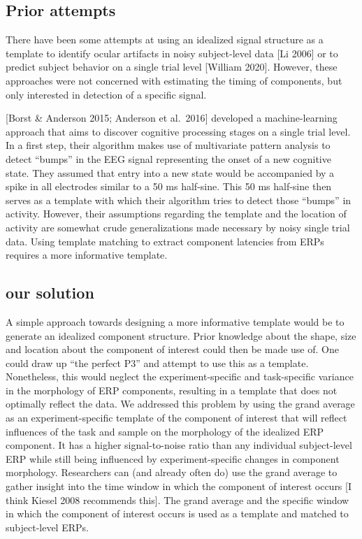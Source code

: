 \documentclass[
  man,floatsintext]{apa7}
\begin{document}
\hypertarget{prior-attempts}{%
\subsection{Prior attempts}\label{prior-attempts}}

There have been some attempts at using an idealized signal structure as a template to identify ocular artifacts in noisy subject-level data {[}Li 2006{]} or to predict subject behavior on a single trial level {[}William 2020{]}. However, these approaches were not concerned with estimating the timing of components, but only interested in detection of a specific signal.

{[}Borst \& Anderson 2015; Anderson et al.~2016{]} developed a machine-learning approach that aims to discover cognitive processing stages on a single trial level. In a first step, their algorithm makes use of multivariate pattern analysis to detect ``bumps'' in the EEG signal representing the onset of a new cognitive state. They assumed that entry into a new state would be accompanied by a spike in all electrodes similar to a 50 ms half-sine. This 50 ms half-sine then serves as a template with which their algorithm tries to detect those ``bumps'' in activity. However, their assumptions regarding the template and the location of activity are somewhat crude generalizations made necessary by noisy single trial data. Using template matching to extract component latencies from ERPs requires a more informative template.

\hypertarget{our-solution}{%
\subsection{our solution}\label{our-solution}}

A simple approach towards designing a more informative template would be to generate an idealized component structure. Prior knowledge about the shape, size and location about the component of interest could then be made use of. One could draw up ``the perfect P3'' and attempt to use this as a template. Nonetheless, this would neglect the experiment-specific and task-specific variance in the morphology of ERP components, resulting in a template that does not optimally reflect the data. We addressed this problem by using the grand average as an experiment-specific template of the component of interest that will reflect influences of the task and sample on the morphology of the idealized ERP component. It has a higher signal-to-noise ratio than any individual subject-level ERP while still being influenced by experiment-specific changes in component morphology. Researchers can (and already often do) use the grand average to gather insight into the time window in which the component of interest occurs {[}I think Kiesel 2008 recommends this{]}. The grand average and the specific window in which the component of interest occurs is used as a template and matched to subject-level ERPs.
\end{document}
